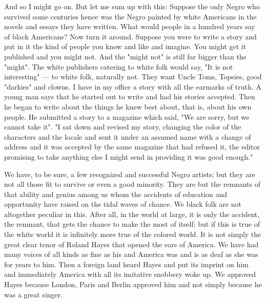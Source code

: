 \documentclass[12pt]{article}
\begin{document}
{\duboispara}%
And so I might go on. But let me sum up with this: Suppose the only Negro who survived some centuries hence was the Negro painted by white Americans in the novels and essays they have written. What would people in a hundred years say of black Americans? Now turn it around. Suppose you were to write a story and put in it the kind of people you know and like and imagine. You might get it published and you might not. And the "might not" is still far bigger than the "might". The white publishers catering to white folk would say, "It is not interesting" --- to white folk, naturally not. They want Uncle Toms, Topsies, good "darkies" and clowns. I have in my office a story with all the earmarks of truth. A young man says that he started out to write and had his stories accepted. Then he began to write about the things he knew best about, that is, about his own people. He submitted a story to a magazine which said, "We are sorry, but we cannot take it". "I sat down and revised my story, changing the color of the characters and the locale and sent it under an assumed name with a change of address and it was accepted by the same magazine that had refused it, the editor promising to take anything else I might send in providing it was good enough." 

{\duboispara}%
We have, to be sure, a few recognized and successful Negro artists; but they are not all those fit to survive or even a good minority. They are but the remnants of that ability and genius among us whom the accidents of education and opportunity have raised on the tidal waves of chance. We black folk are not altogether peculiar in this. After all, in the world at large, it is only the accident, the remnant, that gets the chance to make the most of itself; but if this is true of the white world it is infinitely more true of the colored world. It is not simply the great clear tenor of Roland Hayes that opened the ears of America. We have had many voices of all kinds as fine as his and America was and is as deaf as she was for years to him. Then a foreign land heard Hayes and put its imprint on him and immediately America with all its imitative snobbery woke up. We approved Hayes because London, Paris and Berlin approved him and not simply because he was a great singer. 


\end{document}
